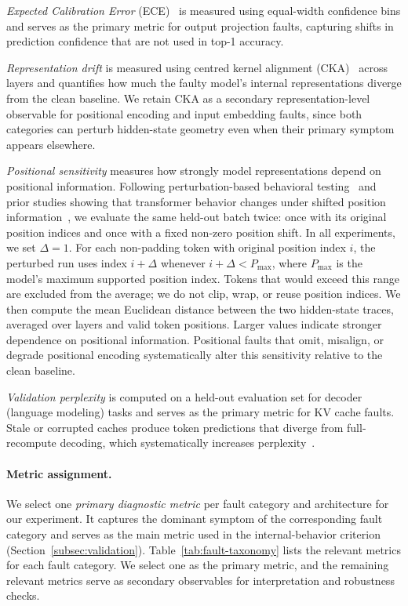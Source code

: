 \emph{Expected Calibration Error} (ECE)~\citep{guo2017calibration} is measured using equal-width confidence bins and serves as the primary metric for output projection faults, capturing shifts in prediction confidence that are not used in top-1 accuracy.

\emph{Representation drift} is measured using centred kernel alignment (CKA)~\citep{kornblith2019similarity} across layers and quantifies how much the faulty model's internal representations diverge from the clean baseline. We retain CKA as a secondary representation-level observable for positional encoding and input embedding faults, since both categories can perturb hidden-state geometry even when their primary symptom appears elsewhere.

\emph{Positional sensitivity} measures how strongly model representations depend on positional information. Following perturbation-based behavioral testing~\citep{chen2018metamorphic,ribeiro2020checklist} and prior studies showing that transformer behavior changes under shifted position information~\citep{sinha-etal-2022-curious,kiyono-etal-2021-shape,kazemnejad2023impact}, we evaluate the same held-out batch twice: once with its original position indices and once with a fixed non-zero position shift. In all experiments, we set $\Delta = 1$. For each non-padding token with original position index $i$, the perturbed run uses index $i+\Delta$ whenever $i+\Delta < P_{\max}$, where $P_{\max}$ is the model's maximum supported position index. Tokens that would exceed this range are excluded from the average; we do not clip, wrap, or reuse position indices. We then compute the mean Euclidean distance between the two hidden-state traces, averaged over layers and valid token positions. Larger values indicate stronger dependence on positional information. Positional faults that omit, misalign, or degrade positional encoding systematically alter this sensitivity relative to the clean baseline.

\emph{Validation perplexity} is computed on a held-out evaluation set for decoder (language modeling) tasks and serves as the primary metric for KV cache faults. Stale or corrupted caches produce token predictions that diverge from full-recompute decoding, which systematically increases perplexity~\citep{zhang2024layer}.

\paragraph{Metric assignment.}
We select one \emph{primary diagnostic metric} per fault category and architecture for our experiment. It captures the dominant symptom of the corresponding fault category and serves as the main metric used in the internal-behavior criterion (Section~\ref{subsec:validation}). Table~\ref{tab:fault-taxonomy} lists the relevant metrics for each fault category. We select one as the primary metric, and the remaining relevant metrics serve as secondary observables for interpretation and robustness checks.


